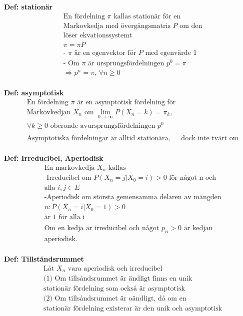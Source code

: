 \begin{multicols}{2}
\textbf{Def: stationär}
\begin{align*}
  &\text{En fördelning $\pi$ kallas stationär för en} \\
  &\text{Markovkedja med övergångsmatris $P$ om den} \\
  &\text{löser ekvationssystemt} \\
  &\pi=\pi P \\
  &\text{- $\pi$ är en egenvektor för $P$ med egenvärde $1$} \\
  &\text{- Om $\pi$ är ursprungsfördelningen } p^0=\pi \\
  &\Rightarrow p^n=\pi, \, \forall{n}\geq0 \\
\end{align*}

\textbf{Def: asymptotisk}
\begin{align*}
  &\text{En fördelning $\pi$ är en asymptotisk fördelning för} \\
  &\text{Markovkedjan ${X_n}$ om } \lim_{0\to\infty}P(X_n=k)=\pi_k, \, \\
  & \forall{k}\geq0 \text{ oberonde avursprungsfördelningen } p^0 \\
  &\\
  &\text{Asymptotiska fördelningar är alltid stationära,} 
  &\text{dock inte tvärt om} \\
\end{align*}

\textbf{Def: Irreducibel, Aperiodisk}
\begin{align*}
  &\text{En markovkedja ${X_n}$ kallas } \\
  &\text{-Irreducibel om $P(X_n=j|X_0=i)>0$ för något n och} \\
  &\text{alla $i,j\in{E}$ } \\
  &\text{-Aperiodisk om största gemensamma delaren av mängden} \\
  &{n: P(X_n=i|X_0=1)>0} \\
  &\text{är 1 för alla i } \\
  &\\
  &\text{Om en kedja är irreducibel och något $p_{ii}>0$ är kedjan} \\
  &\text{aperiodisk.} \\
\end{align*}

\textbf{Def: Tillståndsrummet}
\begin{align*}
  &\text{Låt ${X_n}$ vara aperiodisk och irreducibel} \\
  &\text{(1) Om tillsåndsrummet är ändligt finns en unik} \\
  &\text{stationär fördelning som också är asymptotisk} \\
  &\text{(2) Om tillsåndsrummet är oändligt, då om en} \\
  &\text{stationär fördelning existerar är den unik och asymptotisk} \\
\end{align*}


\end{multicols}
